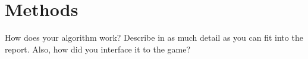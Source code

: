 \section{Methods}
\label{04}

How does your algorithm work? Describe in as much detail as you can fit into the report. Also, how did you interface it to the game?

